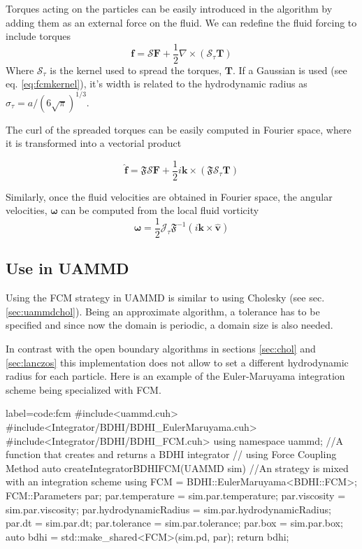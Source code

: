 \documentclass[ twoside,openright,titlepage,numbers=noenddot,%
headinclude,footinclude,cleardoublepage=empty,abstract=on,
BCOR=5mm,paper=a4,fontsize=11pt, dvipsnames
]{scrreprt}
\renewcommand{\vec}[1]{\bm{#1}}
\newcommand{\oper}[1]{\mathcal{#1}}
\newcommand{\uammd}{\gls{UAMMD}\xspace}
\newcommand{\half}{\frac{1}{2}}
\newcommand{\fou}[1]{\widehat{#1}}
\newcommand{\fvel}{v}
\begin{document}
Torques acting on the particles can be easily introduced in the algorithm by adding them as an external force on the fluid. We can redefine the fluid forcing to include torques
\begin{equation}
\vec{f} = \oper{S}\vec{F} + \half\nabla\times(\oper{S}_\tau\vec{T})
\end{equation}
Where $\oper{S}_\tau$ is the kernel used to spread the torques, $\vec{T}$. If a Gaussian is used (see eq. \eqref{eq:fcmkernel}), it's width is related to the hydrodynamic radius as $\sigma_\tau = a/(6\sqrt{\pi})^{1/3}$.

The curl of the spreaded torques can be easily computed in Fourier space, where it is transformed into a vectorial product

\begin{equation}
\fou{\vec{f}} = \mathfrak{F}\oper{S}\vec{F} + \half i\vec{k}\times(\mathfrak{F}\oper{S}_\tau\vec{T})
\end{equation}

Similarly, once the fluid velocities are obtained in Fourier space, the angular velocities, $\vec{\omega}$ can be computed from the local fluid vorticity
\begin{equation}
  \vec{\omega} = \half\oper{J}_\tau\mathfrak{F}^{-1}\left(i\vec{k}\times\fou{\vec{\fvel}}\right)
\end{equation}


\subsection*{Use in UAMMD}
Using the \gls{FCM} strategy in \uammd is similar to using Cholesky (see sec. \ref{sec:uammdchol}). Being an approximate algorithm, a tolerance has to be specified and since now the domain is periodic, a domain size is also needed.

In contrast with the open boundary algorithms in sections \ref{sec:chol} and \ref{sec:lanczos} this implementation does not allow to set a different hydrodynamic radius for each particle.
Here is an example of the Euler-Maruyama integration scheme being specialized with \gls{FCM}.
\begin{code2} {label=code:fcm}
#include<uammd.cuh>
#include<Integrator/BDHI/BDHI_EulerMaruyama.cuh>
#include<Integrator/BDHI/BDHI_FCM.cuh>
using namespace uammd;
//A function that creates and returns a BDHI integrator
// using Force Coupling Method
auto createIntegratorBDHIFCM(UAMMD sim){   
  //An strategy is mixed with an integration scheme
  using FCM = BDHI::EulerMaruyama<BDHI::FCM>;
  FCM::Parameters par;
  par.temperature = sim.par.temperature;
  par.viscosity = sim.par.viscosity;
  par.hydrodynamicRadius = sim.par.hydrodynamicRadius;
  par.dt = sim.par.dt;
  par.tolerance = sim.par.tolerance;
  par.box = sim.par.box;
  auto bdhi = std::make_shared<FCM>(sim.pd, par);
  return bdhi;
}
\end{code2}
\end{document}
